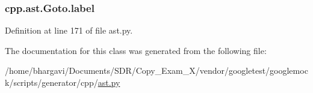 \subsubsection[{\texorpdfstring{label}{label}}]{\setlength{\rightskip}{0pt plus 5cm}cpp.\+ast.\+Goto.\+label}\hypertarget{classcpp_1_1ast_1_1_goto_a685284ea5f3b21f39aff7f5db841c8f5}{}\label{classcpp_1_1ast_1_1_goto_a685284ea5f3b21f39aff7f5db841c8f5}


Definition at line 171 of file ast.\+py.



The documentation for this class was generated from the following file\+:\begin{DoxyCompactItemize}
\item 
/home/bhargavi/\+Documents/\+S\+D\+R/\+Copy\+\_\+\+Exam\+\_\+X/vendor/googletest/googlemock/scripts/generator/cpp/\hyperlink{ast_8py}{ast.\+py}\end{DoxyCompactItemize}
